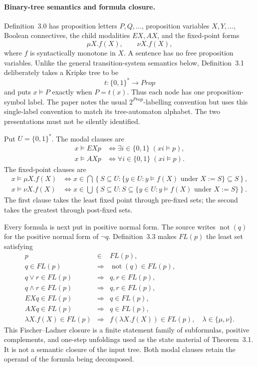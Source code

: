 \paragraph{Binary-tree semantics and formula closure.}
Definition~3.0 has proposition letters \(P,Q,\ldots\), proposition variables
\(X,Y,\ldots\), Boolean connectives, the child modalities \(EX,AX\), and the
fixed-point forms
\[
 \mu X.f(X),\qquad \nu X.f(X),
\]
where \(f\) is syntactically monotone in \(X\).  A sentence has no free
proposition variables.  Unlike the general transition-system semantics below,
Definition~3.1 deliberately takes a Kripke tree to be
\[
 t:\{0,1\}^*\longrightarrow Prop
\]
and puts \(x\models P\) exactly when \(P=t(x)\).  Thus each node has one
proposition-symbol label.  The paper notes the usual
\(2^{Prop}\)-labelling convention but uses this single-label convention to
match its tree-automaton alphabet.  The two presentations must not be silently
identified.

Put \(U=\{0,1\}^*\).  The modal clauses are
\[
\begin{aligned}
 x\models EXp
 &\Longleftrightarrow
   \exists i\in\{0,1\}\;(xi\models p),\\
 x\models AXp
 &\Longleftrightarrow
   \forall i\in\{0,1\}\;(xi\models p).
\end{aligned}
\]
The fixed-point clauses are
\[
\begin{aligned}
 x\models\mu X.f(X)
 &\Longleftrightarrow
 x\in\bigcap\left\{
   S\subseteq U:
   \{y\in U:y\models f(X)\text{ under }X:=S\}\subseteq S
   \right\},\\
 x\models\nu X.f(X)
 &\Longleftrightarrow
 x\in\bigcup\left\{
   S\subseteq U:
   S\subseteq
   \{y\in U:y\models f(X)\text{ under }X:=S\}
   \right\}.
\end{aligned}
\]
The first clause takes the least fixed point through
pre-fixed sets; the second takes the greatest through
post-fixed sets.

Every formula is next put in positive normal form.  The source writes
\(\operatorname{not}(q)\) for the positive normal form of \(\neg q\).
Definition~3.3 makes \(FL(p)\) the least set satisfying
\[
\begin{array}{rcl}
 p&\in&FL(p),\\
 q\in FL(p)&\Longrightarrow&\operatorname{not}(q)\in FL(p),\\
 q\lor r\in FL(p)&\Longrightarrow&q,r\in FL(p),\\
 q\land r\in FL(p)&\Longrightarrow&q,r\in FL(p),\\
 EXq\in FL(p)&\Longrightarrow&q\in FL(p),\\
 AXq\in FL(p)&\Longrightarrow&q\in FL(p),\\
 \lambda X.f(X)\in FL(p)&\Longrightarrow&
 f(\lambda X.f(X))\in FL(p),
 \quad\lambda\in\{\mu,\nu\}.
\end{array}
\]
This Fischer--Ladner closure is a finite statement family of subformulas,
positive complements, and one-step unfoldings used as the state material of
Theorem~3.1. It is not a semantic closure of the input tree.
Both modal clauses retain the operand of the formula
being decomposed.

